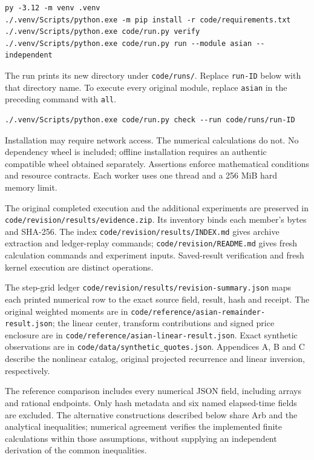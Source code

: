\documentclass[11pt,a4paper]{article}
\begin{document}
\begin{verbatim}
py -3.12 -m venv .venv
./.venv/Scripts/python.exe -m pip install -r code/requirements.txt
./.venv/Scripts/python.exe code/run.py verify
./.venv/Scripts/python.exe code/run.py run --module asian --independent
\end{verbatim}

The run prints its new directory under \texttt{code/runs/}. Replace
\texttt{run-ID} below with that directory name. To execute every original module,
replace \texttt{asian} in the preceding command with \texttt{all}.

\begin{verbatim}
./.venv/Scripts/python.exe code/run.py check --run code/runs/run-ID
\end{verbatim}

Installation may require network access. The numerical calculations do not.
No dependency wheel is included; offline installation requires an authentic
compatible wheel obtained separately. Assertions enforce mathematical conditions
and resource contracts. Each worker uses one thread and a 256 MiB hard memory limit.

The original completed execution and the additional experiments are preserved in
\texttt{code/revision/results/evidence.zip}. Its inventory binds each member's
bytes and SHA-256. The index \texttt{code/revision/results/INDEX.md} gives archive
extraction and ledger-replay commands; \texttt{code/revision/README.md} gives fresh
calculation commands and experiment inputs. Saved-result verification and fresh
kernel execution are distinct operations.

The step-grid ledger
\texttt{code/revision/results/revision-summary.json} maps each printed numerical
row to the exact source field, result, hash and receipt. The original weighted
moments are in \texttt{code/reference/asian-remainder-result.json}; the linear
center, transform contributions and signed price enclosure are in
\texttt{code/reference/asian-linear-result.json}. Exact synthetic observations are
in \texttt{code/data/synthetic\_quotes.json}. Appendices A, B and C describe the
nonlinear catalog, original projected recurrence and linear inversion, respectively.

The reference comparison includes every numerical JSON field, including arrays
and rational endpoints. Only hash metadata and six named elapsed-time fields are
excluded. The alternative constructions described below share
Arb and the analytical inequalities; numerical agreement verifies the implemented
finite calculations within those assumptions, without supplying an independent
derivation of the common inequalities.
\end{document}
